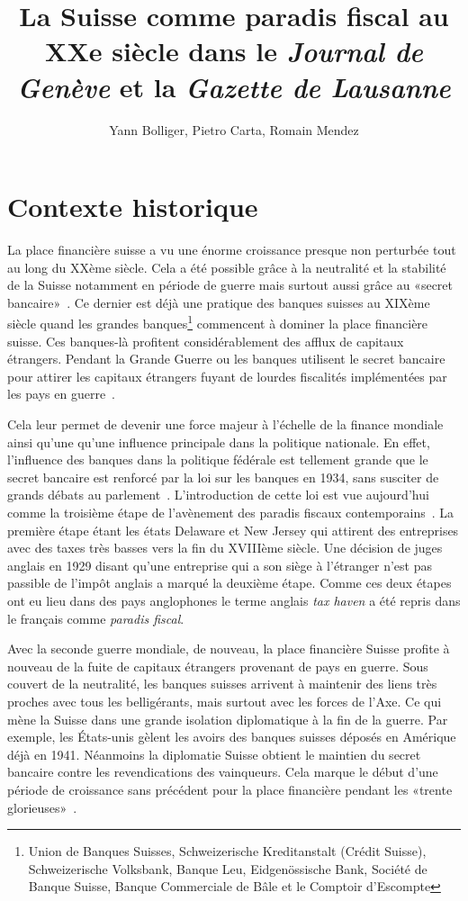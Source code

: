 \documentclass[11pt]{article}
\title{
  La Suisse comme paradis fiscal au XXe siècle dans le
  \textit{Journal de Genève} et la \textit{Gazette de Lausanne}
}
\author{Yann Bolliger, Pietro Carta, Romain Mendez}
\begin{document}
\maketitle

\section{Contexte historique}

La place financière suisse a vu une énorme croissance presque non perturbée tout
au long du XXème siècle. Cela a été possible grâce à la neutralité et la
stabilité de la Suisse notamment en période de guerre mais surtout aussi grâce
au «secret bancaire»~\citep[p. 512]{Mazbouri12}. Ce dernier est déjà une
pratique des banques suisses au XIXème siècle quand les grandes
banques\footnote{Union de Banques Suisses, Schweizerische Kreditanstalt (Crédit
Suisse), Schweizerische Volksbank, Banque Leu, Eidgenössische Bank, Société de
Banque Suisse, Banque Commerciale de Bâle et le Comptoir d’Escompte} commencent
à dominer la place financière suisse. Ces banques-là profitent considérablement
des afflux de capitaux étrangers. Pendant la Grande Guerre ou les banques
utilisent le secret bancaire pour attirer les capitaux étrangers fuyant de
lourdes fiscalités implémentées par les pays en guerre~\citep[p.
484-486]{Mazbouri12}.

Cela leur permet de devenir une force majeur à l’échelle de la finance mondiale
ainsi qu’une qu’une influence principale dans la politique nationale. En effet,
l’influence des banques dans la politique fédérale est tellement grande que le
secret bancaire est renforcé par la loi sur les banques en 1934, sans susciter
de grands débats au parlement~\citep{Guex99}. 
L'introduction de cette loi est vue aujourd'hui comme la troisième étape de 
l'avènement des paradis fiscaux contemporains~\citep[p. 29]{Chavagneux12}. La
première étape étant les états Delaware et New Jersey qui attirent des 
entreprises avec des taxes très basses vers la fin du XVIIIème siècle.
Une décision de juges anglais en 1929 disant qu'une entreprise qui a son siège à 
l'étranger n'est pas passible de l'impôt anglais a marqué la deuxième étape. 
Comme ces deux étapes ont eu lieu dans des pays anglophones le terme anglais 
\textit{tax haven} a été repris dans le français comme \textit{paradis fiscal}.

Avec la seconde guerre mondiale, de nouveau, la place financière Suisse profite
à nouveau de la fuite de capitaux étrangers provenant de pays en guerre. Sous
couvert de la neutralité, les banques suisses arrivent à maintenir des liens
très proches avec tous les belligérants, mais surtout avec les forces de l’Axe.
Ce qui mène la Suisse dans une grande isolation diplomatique à la fin de la
guerre. Par exemple, les États-unis gèlent les avoirs des banques suisses
déposés en Amérique déjà en 1941. Néanmoins la diplomatie Suisse obtient le
maintien du secret bancaire contre les revendications des vainqueurs. Cela
marque le début d’une période de croissance sans précédent pour la place
financière pendant les «trente glorieuses»~\citep[p. 495]{Mazbouri12}.
\end{document}
